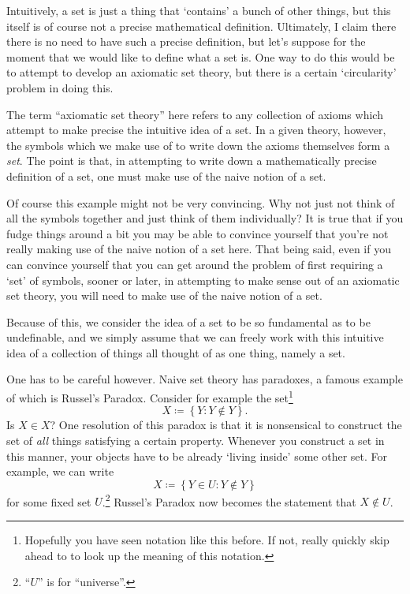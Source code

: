 Intuitively, a set is just a thing that `contains' a bunch of other things, but this itself is of course not a precise mathematical definition.  Ultimately, I claim there there is no need to have such a precise definition, but let's suppose for the moment that we would like to define what a set is.  One way to do this would be to attempt to develop an axiomatic set theory, but there is a certain `circularity' problem in doing this.

The term ``axiomatic set theory'' here refers to any collection of axioms which attempt to make precise the intuitive idea of a set.  In a given theory, however, the symbols which we make use of to write down the axioms themselves form a \emph{set}.  The point is that, in attempting to write down a mathematically precise definition of a set, one must make use of the naive notion of a set.

Of course this example might not be very convincing.  Why not just not think of all the symbols together and just think of them individually?  It is true that if you fudge things around a bit you may be able to convince yourself that you're not really making use of the naive notion of a set here.  That being said, even if you can convince yourself that you can get around the problem of first requiring a `set' of symbols, sooner or later, in attempting to make sense out of an axiomatic set theory, you will need to make use of the naive notion of a set.

Because of this, we consider the idea of a set to be so fundamental as to be undefinable, and we simply assume that we can freely work with this intuitive idea of a collection of things all thought of as one thing, namely a set.

One has to be careful however.  Naive set theory has paradoxes, a famous example of which is Russel's Paradox.  Consider for example the set\footnote{Hopefully you have seen notation like this before.  If not, really quickly skip ahead to  to look up the meaning of this notation.}
\begin{equation}\label{A.1.1}
X\coloneqq \left\{ Y:Y\notin Y\right\} .
\end{equation}
Is $X\in X$?  One resolution of this paradox is that it is nonsensical to construct the set of \emph{all} things satisfying a certain property.  Whenever you construct a set in this manner, your objects have to be already `living inside' some other set.  For example, we can write
\begin{equation}
X\coloneqq \left\{ Y\in U:Y\notin Y\right\}
\end{equation}
for some fixed set $U$.\footnote{``$U$'' is for ``universe''.}  Russel's Paradox now becomes the statement that $X\notin U$.

